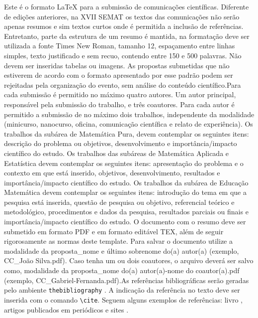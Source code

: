 \documentclass{semat}
\begin{document}
\noindent Este é o formato \LaTeX{} para a submissão de comunicações científicas. Diferente de edições anteriores, na XVII SEMAT os textos das comunicações não serão apenas resumos e sim textos curtos onde é permitida a inclusão de referências. Entretanto, parte da estrutura de um resumo é mantida,  na formatação deve ser utilizada a fonte Times New Roman, tamanho 12, espaçamento entre linhas simples, texto justificado e sem recuo, contendo entre 150 e 500 palavras. Não devem ser inseridas tabelas ou imagens. As propostas submetidas que não estiverem de acordo com o formato apresentado por esse padrão podem ser rejeitadas pela organização do evento, sem análise do conteúdo científico.Para cada submissão é permitido no máximo quatro autores. Um autor principal, responsável pela submissão do trabalho, e três coautores. Para cada autor é permitido a submissão de no máximo dois trabalhos, independente da modalidade (minicurso, nanocurso, oficina, comunicação científica e relato de experiência). Os trabalhos da subárea de Matemática Pura, devem contemplar os seguintes itens: descrição do problema ou objetivos, desenvolvimento e importância/impacto científico do estudo. Os trabalhos das subáreas de Matemática Aplicada e Estatística devem contemplar os seguintes itens: apresentação do problema e o contexto em que está inserido, objetivos, desenvolvimento, resultados e importância/impacto científico do estudo. Os trabalhos da subárea de Educação Matemática devem contemplar os seguintes itens: introdução do tema em que a pesquisa está inserida, questão de pesquisa ou objetivo, referencial teórico e metodológico, procedimentos e dados da pesquisa, resultados parciais ou finais e importância/impacto científico do estudo. O documento com o resumo deve ser submetido em formato PDF e em formato editável TEX, além de seguir rigorosamente as normas deste template. Para salvar o documento utilize a modalidade da proposta\_nome e último sobrenome do(a) autor(a) (exemplo, CC\_João Silva.pdf). Caso tenha um ou dois coautores, o arquivo deverá ser salvo como, modalidade da proposta\_nome do(a) autor(a)-nome do coautor(a).pdf (exemplo, CC\_Gabriel-Fernanda.pdf).As referências bibliográficas serão geradas pelo ambiente \verb+thebibliography+ . A indicação da referência no texto deve ser inserida com o comando \verb+\cite+. Seguem alguns exemplos de referências: livro \cite{conway2013sphere}, artigos publicados em periódicos \cite{burger2004derivatives} e sites \cite{EnCoRI}. 
\end{document}
